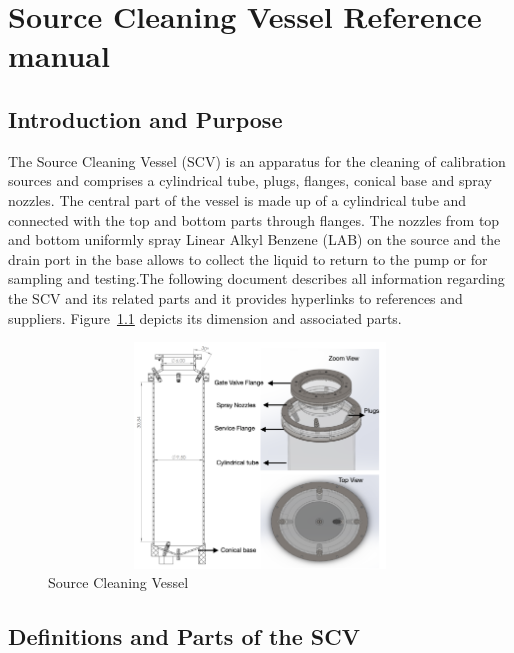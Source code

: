\chapter{Source Cleaning Vessel Reference manual}
\section{Introduction and Purpose}
The Source Cleaning Vessel (SCV) is an apparatus for the cleaning of calibration sources and comprises a cylindrical tube, plugs, flanges, conical base and spray nozzles. The central part of the vessel is made up of a  cylindrical tube and connected with the top and bottom parts through flanges. The nozzles from top and bottom uniformly spray Linear Alkyl Benzene (LAB) on the source  and the drain port in the base allows to collect the liquid to return to the pump or for sampling and testing.The following document describes all information regarding the SCV and its related parts and it provides hyperlinks to references and suppliers. Figure~\ref{fig:SCV} depicts its dimension and associated parts.
\begin{figure}[!htpb]
  \centering
  \includegraphics[width = 12cm, height=6cm ]{figures/SCV1}
  \caption{Source Cleaning Vessel}
  \label{fig:SCV}
\end{figure}

\section{ Definitions and Parts of the SCV}

